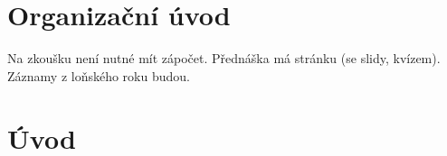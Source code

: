 \documentclass[12pt]{article}					%
\begin{document}

\section*{Organizační úvod}
\begin{poznamka}
	Na zkoušku není nutné mít zápočet. Přednáška má stránku (se slidy, kvízem). Záznamy z loňského roku budou.
\end{poznamka}

\section{Úvod}
\end{document}
